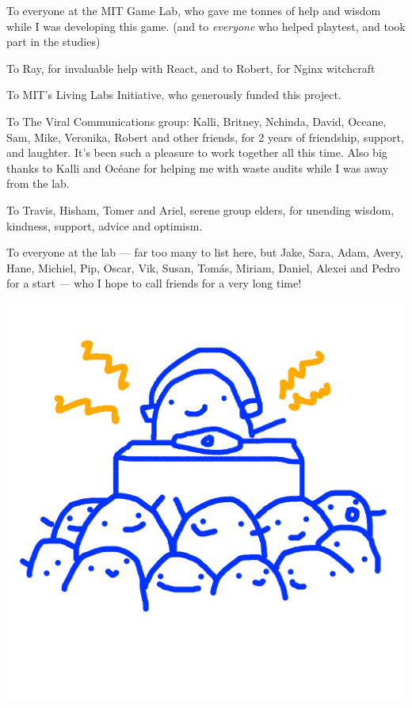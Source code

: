 \documentclass[nofonts,nols,justified,nobib]{tufte-book}
\begin{document}
To everyone at the MIT Game Lab, who gave me tonnes of help and wisdom while I was developing this game. (and to \emph{everyone} who helped playtest, and took part in the studies)

To Ray, for invaluable help with React, and to Robert, for Nginx witchcraft

To MIT’s Living Labs Initiative, who generously funded this project.

To The Viral Communications group: Kalli, Britney, Nchinda, David, Oceane, Sam, Mike, Veronika, Robert and other friends, for 2 years of friendship, support, and laughter. It’s been such a pleasure to work together all this time. Also big thanks to Kalli and Oc\'eane for helping me with waste audits while I was away from the lab.

To Travis, Hisham, Tomer and Ariel, serene group elders, for unending wisdom, kindness, support, advice and optimism.

To everyone at the lab — far too many to list here, but Jake, Sara, Adam, Avery, Hane, Michiel, Pip, Oscar, Vik, Susan, Tom\'as, Miriam, Daniel, Alexei and Pedro for a start — who I hope to call friends for a very long time! 

\begin{marginfigure}
\includegraphics[width=\textwidth]{img/1/99f.png}
\end{marginfigure}
\end{document}
